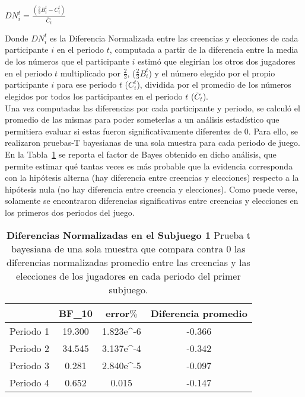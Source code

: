 \begin{center}
$DN_i^t =  \frac{(\frac{2}{3}B_i^t - C_i^t)}{\overline{C}_t} $
\end{center}

Donde $DN_i^t$ es la Diferencia Normalizada entre las creencias y elecciones de cada participante $i$ en el periodo $t$, computada a partir de la diferencia entre  la media de los números que el participante $i$ estimó que elegirían los otros dos jugadores en el periodo $t$ multiplicado por $\frac{2}{3}$, ($\frac{2}{3}B_i^t$) y el número elegido por el propio participante $i$ para ese periodo $t$ ($C_i^t$), dividida por el promedio de los números elegidos por todos los participantes en el periodo $t$ ($\overline{C}_t$).\\

Una vez computadas las diferencias por cada participante y periodo, se calculó el promedio de las mismas para poder someterlas a un análisis estadístico que permitiera evaluar si estas fueron significativamente diferentes de 0. Para ello, se realizaron pruebas-T bayesianas de una sola muestra para cada periodo de juego. En la Tabla~\ref{DN-S1-B} se reporta el factor de Bayes obtenido en dicho análisis, que permite estimar qué tantas veces es más probable que la evidencia corresponda con la hipótesis alterna (hay diferencia entre creencias y elecciones) respecto a la hipótesis nula (no hay diferencia entre creencia y elecciones). Como puede verse, solamente se encontraron diferencias significativas entre creencias y elecciones en los primeros dos periodos del juego.\\

\begin{table}[h]
\caption[Prueba t de una muestra: Diferencias Normalizadas en el Subjuego 1]{\textbf{Diferencias Normalizadas en el Subjuego 1} Prueba t bayesiana de una sola muestra que compara contra 0 las diferencias normalizadas promedio entre las creencias y las elecciones de los jugadores en cada periodo del primer subjuego.}
\label{DN-S1-B}
\centering
\begin{tabular}{l | c c | c}
\toprule
\textbf{} & \textbf{BF_10} & \textbf{error$\%$} & \textbf{Diferencia promedio}\\
\midrule
Periodo 1 & 19.300 & 1.823e^-6 & -0.366\\
Periodo 2 & 34.545 & 3.137e^-4 & -0.342\\
Periodo 3 & 0.281 & 2.840e^-5 & -0.097\\
Periodo 4 & 0.652 & 0.015 & -0.147\\
\bottomrule
\end{tabular}
\end{table}

